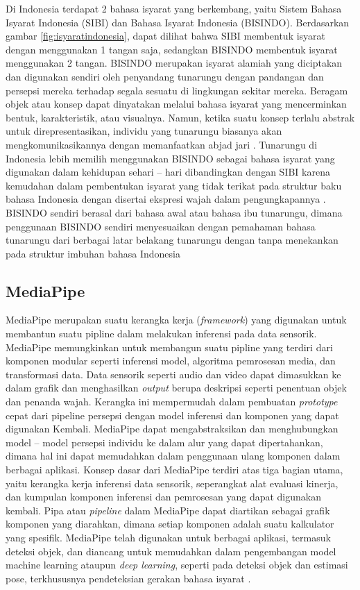 Di Indonesia terdapat 2 bahasa isyarat yang berkembang, yaitu Sistem Bahasa Isyarat Indonesia (SIBI) dan Bahasa Isyarat Indonesia (BISINDO). Berdasarkan gambar \ref{fig:isyaratindonesia}, dapat dilihat bahwa SIBI membentuk isyarat dengan menggunakan 1 tangan saja, sedangkan BISINDO membentuk isyarat menggunakan 2 tangan. BISINDO merupakan isyarat alamiah yang diciptakan dan digunakan sendiri oleh penyandang tunarungu dengan pandangan dan persepsi mereka terhadap segala sesuatu di lingkungan sekitar mereka. Beragam objek atau konsep dapat dinyatakan melalui bahasa isyarat yang mencerminkan bentuk, karakteristik, atau visualnya. Namun, ketika suatu konsep terlalu abstrak untuk direpresentasikan, individu yang tunarungu biasanya akan mengkomunikasikannya dengan memanfaatkan abjad jari \parencite{wedayanti2019}. Tunarungu di Indonesia lebih memilih menggunakan BISINDO sebagai bahasa isyarat yang digunakan dalam kehidupan sehari – hari dibandingkan dengan SIBI karena kemudahan dalam pembentukan isyarat yang tidak terikat pada struktur baku bahasa Indonesia dengan disertai ekspresi wajah dalam pengungkapannya \parencite{handhika2018}. BISINDO sendiri berasal dari bahasa awal atau bahasa ibu tunarungu, dimana penggunaan BISINDO sendiri menyesuaikan dengan pemahaman bahasa tunarungu dari berbagai latar belakang tunarungu dengan tanpa menekankan pada struktur imbuhan bahasa Indonesia \parencite{mursita2015}

\subsection{MediaPipe}
MediaPipe merupakan suatu kerangka kerja (\emph{framework}) yang digunakan untuk membantun suatu pipline dalam melakukan inferensi pada data sensorik. MediaPipe memungkinkan untuk membangun suatu pipline yang terdiri dari komponen modular seperti inferensi model, algoritma pemrosesan media, dan transformasi data. Data sensorik seperti audio dan video dapat dimasukkan ke dalam grafik dan menghasilkan \emph{output} berupa deskripsi seperti penentuan objek dan penanda wajah. Kerangka ini mempermudah dalam pembuatan \emph{prototype} cepat dari pipeline persepsi dengan model inferensi dan komponen yang dapat digunakan Kembali. MediaPipe dapat mengabstraksikan dan menghubungkan model – model persepsi individu ke dalam alur yang dapat dipertahankan, dimana hal ini dapat memudahkan dalam penggunaan ulang komponen dalam berbagai aplikasi. Konsep dasar dari MediaPipe terdiri atas tiga bagian utama, yaitu kerangka kerja inferensi data sensorik, seperangkat alat evaluasi kinerja, dan kumpulan komponen inferensi dan pemrosesan yang dapat digunakan kembali. Pipa atau \emph{pipeline} dalam MediaPipe dapat diartikan sebagai grafik komponen yang diarahkan, dimana setiap komponen adalah suatu kalkulator yang spesifik. MediaPipe telah digunakan untuk berbagai aplikasi, termasuk deteksi objek, dan diancang untuk memudahkan dalam pengembangan model machine learning ataupun \emph{ deep learning}, seperti pada deteksi objek dan estimasi pose, terkhususnya pendeteksian gerakan bahasa isyarat \parencite{lugaresi2019:}.

